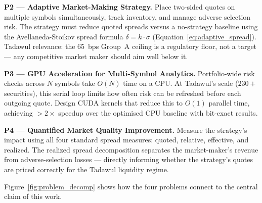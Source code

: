 \documentclass[12pt]{article}
\begin{document}
\textbf{P2 — Adaptive Market-Making Strategy.}
Place two-sided quotes on multiple symbols simultaneously, track inventory,
and manage adverse selection risk.
The strategy must reduce quoted spreads versus a no-strategy baseline
using the Avellaneda-Stoikov spread formula
$\delta = k \cdot \sigma$ (Equation~\ref{eq:adaptive_spread}).
Tadawul relevance: the 65~bps Group~A ceiling is a regulatory floor, not
a target --- any competitive market maker should aim well below it.

\textbf{P3 — GPU Acceleration for Multi-Symbol Analytics.}
Portfolio-wide risk checks across $N$ symbols take $O(N)$ time on a CPU.
At Tadawul's scale ($230+$ securities), this serial loop limits how often
risk can be refreshed before each outgoing quote.
Design CUDA kernels that reduce this to $O(1)$ parallel time, achieving
$>2\times$ speedup over the optimised CPU baseline with bit-exact results.

\textbf{P4 — Quantified Market Quality Improvement.}
Measure the strategy's impact using all four standard spread measures:
quoted, relative, effective, and realized.
The realized spread decomposition \cite{huang1996} separates the
market-maker's revenue from adverse-selection losses --- directly
informing whether the strategy's quotes are priced correctly for the
Tadawul liquidity regime.

Figure~\ref{fig:problem_decomp} shows how the four problems connect to
the central claim of this work.
\end{document}
